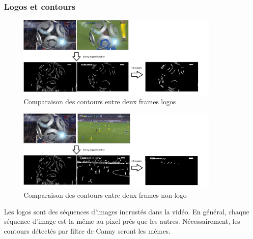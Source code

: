 \documentclass[11pt]{article}
\begin{document}
\subsubsection{Logos et contours}
\label{sec:orgecda9e1}
\begin{figure}[htbp]
\centering
\includegraphics[width=10cm]{comparison_idea.png}
\caption{Comparaison des contours entre deux frames logos}
\end{figure}
\begin{figure}[htbp]
\centering
\includegraphics[width=10cm]{comparison_idea2.png}
\caption{Comparaison des contours entre deux frames non-logo}
\end{figure}

Les logos sont des séquences d'images incrustés dans la vidéo. En général, chaque séquence d'image est la même au pixel près que les autres. Nécessairement, les contours détectés par filtre de Canny seront les mêmes.\\
\end{document}
